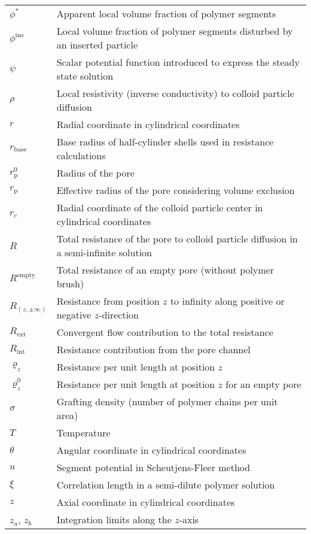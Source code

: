 \documentclass[10pt, a4paper]{article}
\begin{document}
\begin{tabularx}{\linewidth}{l X}
    $\phi^{\ast}$ & Apparent local volume fraction of polymer segments \\
    $\phi^{\text{ins}}$ & Local volume fraction of polymer segments disturbed by an inserted particle \\
    $\psi$ & Scalar potential function introduced to express the steady state solution \\
    $\rho$ & Local resistivity (inverse conductivity) to colloid particle diffusion \\
    $r$ & Radial coordinate in cylindrical coordinates \\
    $r_{\text{base}}$ & Base radius of half-cylinder shells used in resistance calculations\\
    $r_{\text{p}}^{0}$ & Radius of the pore \\
    $r_{\text{p}}$ & Effective radius of the pore considering volume exclusion \\
    $r_{c}$ & Radial coordinate of the colloid particle center in cylindrical coordinates \\
    $R$ & Total resistance of the pore to colloid particle diffusion in a semi-infinite solution \\
    $R^{\text{empty}}$ & Total resistance of an empty pore (without polymer brush) \\
    $R_{(z, \pm\infty)}$ & Resistance from position $z$ to infinity along positive or negative $z$-direction \\
    $R_{\text{ext}}$ & Convergent flow contribution to the total resistance \\
    $R_{\text{int}}$ & Resistance contribution from the pore channel \\
    $\varrho_{z}$ & Resistance per unit length at position $z$ \\
    $\varrho_{z}^{0}$ & Resistance per unit length at position $z$ for an empty pore \\
    $\sigma$ & Grafting density (number of polymer chains per unit area) \\
    $T$ & Temperature \\
    $\theta$ & Angular coordinate in cylindrical coordinates \\
    $u$ & Segment potential in Scheutjens-Fleer method\\
    $\xi$ & Correlation length in a semi-dilute polymer solution \\
    $z$ & Axial coordinate in cylindrical coordinates \\
    $z_a$, $z_b$ & Integration limits along the $z$-axis \\

\end{tabularx}
\end{document}
